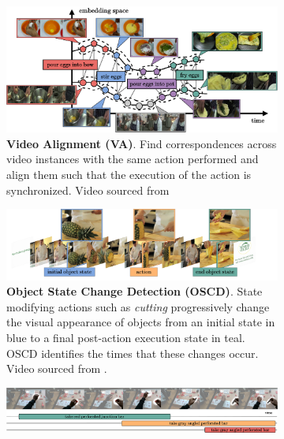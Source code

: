 \begin{figure}[t]
\begin{minipage}{0.49\textwidth}
\begin{subfigure}{\linewidth}
\label{fig:states::reasoning}
\end{subfigure}
\end{minipage}
\hfill
\begin{minipage}{0.49\textwidth} 
\addtocounter{subfigure}{-1} 
\begin{subfigure}{\linewidth}
\includegraphics[width=\linewidth]{figs/states/states-alignment.pdf}
\caption{\textbf{Video Alignment (VA)}. Find correspondences across video instances with the same action performed and align them such that the execution of the action is synchronized. Video sourced from \citet{tang2019coin} \vspace{.5em}}
\label{fig:states::align}
\end{subfigure}
\hfill
\begin{subfigure}{\linewidth}
\includegraphics[width=\linewidth]{figs/states/states-object_state_change.pdf}
\caption{\textbf{Object State Change Detection (OSCD)}. State modifying actions such as \textit{cutting} progressively change the visual appearance of objects from an initial state in \textcolor{babyblue}{blue} to a final post-action execution state in \textcolor{pastelteal}{teal}. OSCD identifies the times that these changes occur. Video sourced from \citet{souvcek2022look}. \vspace{0.5em}}
\label{fig:states::oscd}
\end{subfigure}
\end{minipage} %
\begin{subfigure}{\linewidth}
\includegraphics[width=\linewidth]{figs/states/states-active_object.pdf}

\end{subfigure}
\end{figure}
